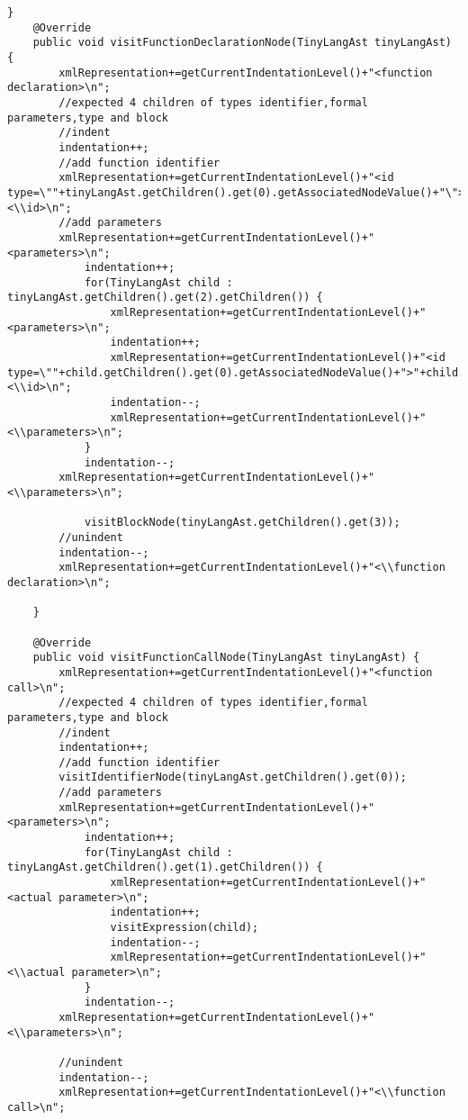 \begin{lstlisting}[basicstyle=\miniscule,caption=Generating an XML representation of AST,label=listing:xmlGeneration]
	}
	@Override
	public void visitFunctionDeclarationNode(TinyLangAst tinyLangAst) {
		xmlRepresentation+=getCurrentIndentationLevel()+"<function declaration>\n";
		//expected 4 children of types identifier,formal parameters,type and block
		//indent
		indentation++;
		//add function identifier
		xmlRepresentation+=getCurrentIndentationLevel()+"<id type=\""+tinyLangAst.getChildren().get(0).getAssociatedNodeValue()+"\">"+tinyLangAst.getChildren().get(1).getAssociatedNodeValue()+"<\\id>\n";
		//add parameters
		xmlRepresentation+=getCurrentIndentationLevel()+"<parameters>\n";
			indentation++;
			for(TinyLangAst child : tinyLangAst.getChildren().get(2).getChildren()) {
				xmlRepresentation+=getCurrentIndentationLevel()+"<parameters>\n";
				indentation++;
				xmlRepresentation+=getCurrentIndentationLevel()+"<id type=\""+child.getChildren().get(0).getAssociatedNodeValue()+">"+child.getChildren().get(1).getAssociatedNodeValue()+"<\\id>\n";
				indentation--;
				xmlRepresentation+=getCurrentIndentationLevel()+"<\\parameters>\n";
			}
			indentation--;
		xmlRepresentation+=getCurrentIndentationLevel()+"<\\parameters>\n";

			visitBlockNode(tinyLangAst.getChildren().get(3));
		//unindent
		indentation--;
		xmlRepresentation+=getCurrentIndentationLevel()+"<\\function declaration>\n";			
				
	}
	
	@Override
	public void visitFunctionCallNode(TinyLangAst tinyLangAst) {
		xmlRepresentation+=getCurrentIndentationLevel()+"<function call>\n";
		//expected 4 children of types identifier,formal parameters,type and block
		//indent
		indentation++;
		//add function identifier
		visitIdentifierNode(tinyLangAst.getChildren().get(0));
		//add parameters
		xmlRepresentation+=getCurrentIndentationLevel()+"<parameters>\n";
			indentation++;
			for(TinyLangAst child : tinyLangAst.getChildren().get(1).getChildren()) {
				xmlRepresentation+=getCurrentIndentationLevel()+"<actual parameter>\n";
				indentation++;
				visitExpression(child);
				indentation--;
				xmlRepresentation+=getCurrentIndentationLevel()+"<\\actual parameter>\n";
			}
			indentation--;
		xmlRepresentation+=getCurrentIndentationLevel()+"<\\parameters>\n";

		//unindent
		indentation--;
		xmlRepresentation+=getCurrentIndentationLevel()+"<\\function call>\n";		
				

\end{lstlisting}

